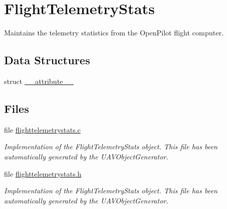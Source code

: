 \hypertarget{group___flight_telemetry_stats}{\section{\-Flight\-Telemetry\-Stats}
\label{group___flight_telemetry_stats}
}


\-Maintains the telemetry statistics from the \-Open\-Pilot flight computer.  


\subsection*{\-Data \-Structures}
\begin{DoxyCompactItemize}
\item 
struct \hyperlink{struct____attribute____}{\-\_\-\-\_\-attribute\-\_\-\-\_\-}
\end{DoxyCompactItemize}
\subsection*{\-Files}
\begin{DoxyCompactItemize}
\item 
file \hyperlink{flighttelemetrystats_8c}{flighttelemetrystats.\-c}
\begin{DoxyCompactList}\small\item\em \-Implementation of the \-Flight\-Telemetry\-Stats object. \-This file has been automatically generated by the \-U\-A\-V\-Object\-Generator. \end{DoxyCompactList}\item 
file \hyperlink{flighttelemetrystats_8h}{flighttelemetrystats.\-h}
\begin{DoxyCompactList}\small\item\em \-Implementation of the \-Flight\-Telemetry\-Stats object. \-This file has been automatically generated by the \-U\-A\-V\-Object\-Generator. \end{DoxyCompactList}\end{DoxyCompactItemize}

